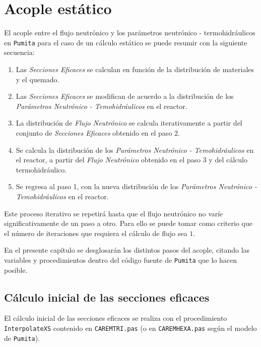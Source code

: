 \chapter{Acople estático}\label{ch:estatico}
El acople entre el flujo neutrónico y los parámetros neutrónico - termohidráulicos en \texttt{Pumita} para el caso de un cálculo estático se puede resumir con la siguiente secuencia:


\begin{enumerate}
    \item Las \emph{Secciones Eficaces} se calculan en función de la distribución de materiales y el quemado.
    \item Las \emph{Secciones Eficaces} se modifican de acuerdo a la distribución de los \emph{Parámetros Neutrónico - Temohidráulicos} en el reactor.
    \item La distribución de \emph{Flujo Neutrónico} se calcula iterativamente a partir del conjunto de \emph{Secciones Eficaces} obtenido en el paso 2.
    \item Se calcula la distribución de los \emph{Parámetros Neutrónico - Temohidráulicos} en el reactor, a partir del \emph{Flujo Neutrónico} obtenido en el paso 3 y del cálculo termohidráulico.
    \item Se regresa al paso 1, con la nueva distribución de los \emph{Parámetros Neutrónico - Temohidráulicos} en el reactor.
\end{enumerate}

Este proceso iterativo se repetirá hasta que el flujo neutrónico no varíe significativamente de un paso a otro. Para ello se puede tomar como criterio que el número de iteraciones que requiera el cálculo de flujo sea $1$.

En el presente capítulo se desglosarán los distintos pasos del acople, citando las variables y procedimientos dentro del código fuente de \texttt{Pumita} que lo hacen posible.

\section{Cálculo inicial de las secciones eficaces}
 El cálculo inicial de las secciones eficaces se realiza con el procedimiento \texttt{InterpolateXS} contenido en \texttt{CAREMTRI.pas} (o en \texttt{CAREMHEXA.pas} según el modelo de \texttt{Pumita}). 
 
